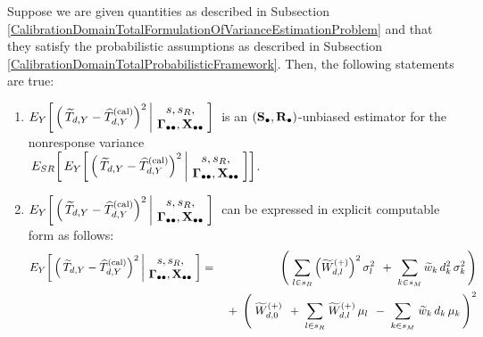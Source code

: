 \vskip 0.1cm
\begin{lemma}
\label{CalibrationDomainTotalNonresponseVariance}
\mbox{}
\vskip 0.1cm
\noindent
Suppose we are given quantities as described in Subsection
\ref{CalibrationDomainTotalFormulationOfVarianceEstimationProblem}
and
that they satisfy the probabilistic assumptions as described in Subsection
\ref{CalibrationDomainTotalProbabilisticFramework}.
\vskip 0.1cm
\noindent
Then, the following statements are true:
\renewcommand{\theenumi}{\roman{enumi}}
\renewcommand{\labelenumi}{\mbox{}\;\;\,(\theenumi)$\quad$}
\begin{enumerate}
\item
    $
    E_{Y}\!\left[\,
        \left(\,\widetilde{T}_{d,Y} - \widehat{T}^{\textnormal{(cal)}}_{d,Y}\right)^{2}
        \left\vert\!
        \begin{array}{c} s,s_{R}, \\ \mathbf{\Gamma}_{\bullet\bullet},\mathbf{X}_{\bullet\bullet} \end{array}
        \right.
        \!\!\right]
    $\,
    is an $(\mathbf{S}_{\bullet},\mathbf{R}_{\bullet})$-unbiased estimator for the nonresponse variance\\
    \,$
    E_{SR}\!\left[\,
    E_{Y}\!\left[\,
        \left(\,\widetilde{T}_{d,Y} - \widehat{T}^{\textnormal{(cal)}}_{d,Y}\right)^{2}
        \left\vert\!
        \begin{array}{c} s,s_{R}, \\ \mathbf{\Gamma}_{\bullet\bullet},\mathbf{X}_{\bullet\bullet} \end{array}
        \right.
        \!\!\right]
        \right]
    $.
\item
    $
    E_{Y}\!\left[\,
        \left(\,\widetilde{T}_{d,Y} - \widehat{T}^{\textnormal{(cal)}}_{d,Y}\right)^{2}
        \left\vert\!
        \begin{array}{c} s,s_{R}, \\ \mathbf{\Gamma}_{\bullet\bullet},\mathbf{X}_{\bullet\bullet} \end{array}
        \right.
        \!\!\right]
    $\,
    can be expressed in explicit computable form as follows:
    \begin{eqnarray*}
    E_{Y}\!\left[\,
        \left(\,\widetilde{T}_{d,Y} - \widehat{T}^{\textnormal{(cal)}}_{d,Y}\right)^{2}
        \left\vert\!
        \begin{array}{c} s,s_{R}, \\ \mathbf{\Gamma}_{\bullet\bullet},\mathbf{X}_{\bullet\bullet} \end{array}
        \right.
        \!\!\right]
    & = &
        \left(\;
            \underset{l \in s_{R}}{\sum}
                \left(\widetilde{W}^{(+)}_{d,l}\right)^{2}\sigma_{l}^{2}
            \,\;+\;
            \underset{k \in s_{M}}{\sum}\,
                \widetilde{w}_{k}\,d_{k}^{2}\,\sigma_{k}^{2}
            \,\right)
    \\
    &&
        \; + \;
        \left(\;
            \widetilde{W}^{(+)}_{d,0}
            \,\;+\;
            \underset{l \in s_{R}}{\sum}\;\widetilde{W}^{(+)}_{d,l}\,\mu_{l}
            \,\;-\;
            \underset{k \in s_{M}}{\sum}\;\widetilde{w}_{k}\,d_{k}\,\mu_{k}
            \,\right)^{2}
    \end{eqnarray*}
\end{enumerate}
\end{lemma}
